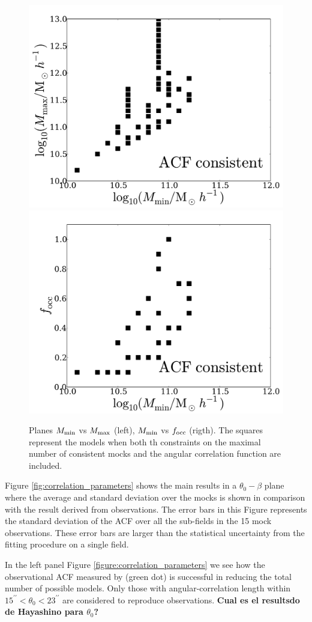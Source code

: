 \documentclass[usenatbib]{mn2e}
\begin{document}
\begin{figure}
\begin{center}
\includegraphics[width=0.46\linewidth,angle=0]{./plots/Fig6_mass.pdf}
\hspace{5mm}
\includegraphics[width=0.46\linewidth,angle=0]{./plots/Fig6_f_occ.pdf}
\end{center}
\caption{Planes $M_{\rm min}$ vs $M_{\rm max}$ (left), $M_{\rm min}$
  vs $f_{\rm occ}$ (rigth). The squares represent the models when both
  th constraints on the maximal number of  consistent mocks and the
  angular correlation function are included. 
  \label{fig:restriction_mock_and_f_occ_corr}} 
\end{figure} 


Figure \ref{fig:correlation_parameters} shows the main results in a
$\theta_{0}-\beta$  plane where the average and standard deviation
over the mocks is shown in comparison with the result derived from
observations.  The error bars in this Figure represents the standard
deviation of the ACF over all the sub-fields in the 15 mock
observations. These error bars are larger than the statistical
uncertainty from the fitting procedure on a single field. 

In the left panel Figure \ref{figure:correlation_parameters} we see
how the observational ACF measured by \cite{Hayashino2004} (green dot)
is successful in reducing the total number of possible models. Only
those with angular-correlation length within
$15^{\prime\prime}<\theta_{0}<23^{\prime\prime}$ are considered to
reproduce observations.     {\bf Cual es el resultsdo de Hayashino
  para $\theta_0$?}
\end{document}
